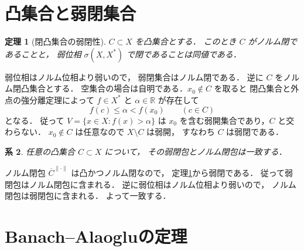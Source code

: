 \documentclass[a5paper,10pt,onecolumn]{jsarticle}
\makeatletter
\theoremstyle{mathnotetheorem}
\newtheorem{theorem}{定理}[section]
\newtheorem{corollary}[theorem]{系}
\renewcommand{\proofname}{証明}
\renewenvironment{proof}[1][\proofname]{%
  \par\pushQED{\qed}\normalfont\topsep4\p@\@plus2\p@\relax
  \trivlist\item[\hskip\labelsep\bfseries #1]\ignorespaces
}{\popQED\endtrivlist\@endpefalse}
\newcommand{\norm}[1]{\lVert #1\rVert}
\makeatother
\begin{document}
\section{凸集合と弱閉集合}

\begin{theorem}[閉凸集合の弱閉性]\label{thm:weak-closed}
$C\subset X$ を凸集合とする．
このとき $C$ がノルム閉であることと，
弱位相 $\sigma(X,X^*)$ で閉であることは同値である．
\end{theorem}
\begin{proof}
弱位相はノルム位相より弱いので，
弱閉集合はノルム閉である．
逆に $C$ をノルム閉凸集合とする．
空集合の場合は自明である．$x_0\notin C$ を取ると
閉凸集合と外点の強分離定理によって
$f\in X^*$ と $\alpha\in\mathbb R$ が存在して
\[
 f(c)\le\alpha<f(x_0)\qquad(c\in C)
\]
となる．
従って
$V=\{x\in X:f(x)>\alpha\}$ は
$x_0$ を含む弱開集合であり，$C$ と交わらない．
$x_0\notin C$ は任意なので $X\setminus C$ は弱開，
すなわち $C$ は弱閉である．
\end{proof}

\begin{corollary}\label{cor:weak-closure}
任意の凸集合 $C\subset X$ について，
その弱閉包とノルム閉包は一致する．
\end{corollary}
\begin{proof}
ノルム閉包 $\overline C^{\norm{\cdot}}$ は凸かつノルム閉なので，
定理\ref{thm:weak-closed}から弱閉である．
従って弱閉包はノルム閉包に含まれる．
逆に弱位相はノルム位相より弱いので，
ノルム閉包は弱閉包に含まれる．
よって一致する．
\end{proof}

\section{Banach--Alaogluの定理}
\end{document}
